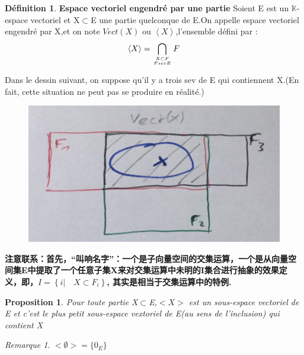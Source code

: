 \documentclass[12pt]{book}
\theoremstyle{definition}\newtheorem{dfn}{Définition}[chapter]
\theoremstyle{plain}\newtheorem{thm}{Théorème}[chapter]
\theoremstyle{plain}\newtheorem{prp}{Proposition}[chapter]
\theoremstyle{plain}\newtheorem{lem}{\bf Lemme}[chapter]
\theoremstyle{plain}\newtheorem{axm}{\bf Axiome}[chapter]
\theoremstyle{plain}\newtheorem{lmm}{\bf Lemme}[chapter]
\theoremstyle{plain}\newtheorem{exm}{\bf Example}[chapter]
\theoremstyle{plain}\newtheorem{cor}{\bf Corollaire}[chapter]
\theoremstyle{remark}\newtheorem{rem}{Remarque}[chapter]
\begin{document}
\begin{dfn}{\bf Espace vectoriel engendré par une partie}
Soient E est un $\mathbb{K}$-espace vectoriel et X$\subset$E une partie {\color{red} quelconque} de E.On appelle espace vectoriel
engendré par X,et on note $\mathit{Vect}(X)$
ou $\left \langle X \right \rangle$,l'ensemble défini par :
 \begin{align*}
 \left \langle X \right \rangle = \bigcap_{X\subset F   \atop F sev E}F
 \end{align*}
\end{dfn}

Dans le dessin suivant, on suppose qu'il y a trois sev de E qui contiennent X.(En fait, cette situation ne peut pas se produire en réalité.)
 \begin{figure}[H]
        \centering
        \includegraphics[width=1\textwidth]{image//Operation sur les espaces vectoriels//1}
        \end{figure}

\textbf{注意联系：首先，“叫响名字”：一个是子向量空间的交集运算，一个是从向量空间集E中提取了一个任意子集X来对交集运算中未明的I集合进行抽象的效果定义，即，$I=\left \{i|\quad  X \subset F_i\right \}$, 其实是相当于交集运算中的特例.}

\begin{prp}
        Pour toute partie X$\subset$E,$<X>$ est un sous-espace vectoriel de E et c'est le plus petit sous-espace vextoriel de E(au sens de l'inclusion) qui contient X
\end{prp}
\begin{rem}
        $<\emptyset>=\{0_E\}$
\end{rem}
\end{document}
